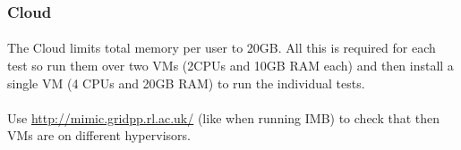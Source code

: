 \documentclass{article}
\begin{document}
        \subsubsection{Cloud}

            \paragraph{}
            The Cloud limits total memory per user to 20GB. All this is required for each test so run them over two VMs (2CPUs and 10GB RAM each) and then install a single VM (4 CPUs and 20GB RAM) to run the individual tests.

            \paragraph{}
            Use \url{http://mimic.gridpp.rl.ac.uk/} (like when running IMB) to check that then VMs are on different hypervisors.
\end{document}

